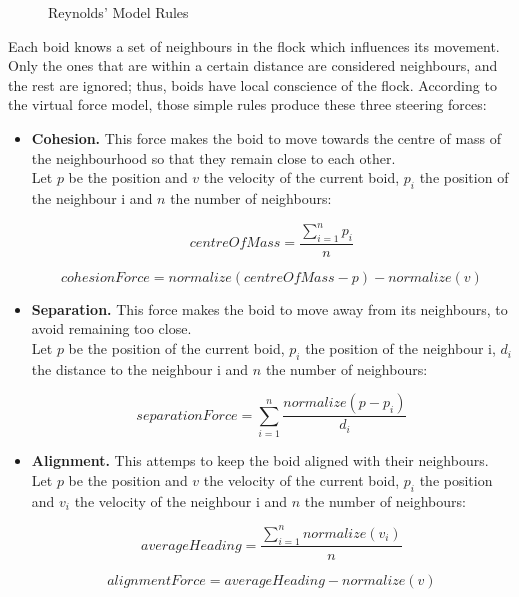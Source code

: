 \begin{figure}[!h]
\begin{tabular}{c c c}
 \end{tabular}
  \caption{Reynolds' Model Rules}
  \label{fig:crowds}
\end{figure}

Each boid knows a set of neighbours in the flock which influences its movement. Only the ones that are within a certain distance are considered neighbours, and the rest are ignored; thus, boids have local conscience of the flock. According to the virtual force model, those simple rules produce these three steering forces:

\begin{itemize}

\item{{\bf Cohesion.} This force makes the boid to move towards the centre of mass of the neighbourhood so that they remain close to each other.\\

Let $p$ be the position and $v$ the velocity of the current boid, $p_i$ the position of the neighbour i and $n$ the number of neighbours:

\begin{equation}
  centreOfMass=\frac{\sum_{i=1}^np_i}{n}
\end{equation}

\begin{equation}
  cohesionForce=normalize(centreOfMass-p)-normalize(v)
\end{equation}
}

\item{{\bf Separation.} This force makes the boid to move away from its neighbours, to avoid remaining too close.\\

Let $p$ be the position of the current boid, $p_i$ the position of the neighbour i, $d_i$ the distance to the neighbour i and $n$ the number of neighbours:

\begin{equation}
  separationForce=\sum_{i=1}^n\frac{normalize(p-p_i)}{d_i}
\end{equation}
}

\item{{\bf Alignment.} This attemps to keep the boid aligned with their neighbours.\\

Let $p$ be the position and $v$ the velocity of the current boid, $p_i$ the position and $v_i$ the velocity of the neighbour i and $n$ the number of neighbours:

\begin{equation}
  averageHeading=\frac{\sum_{i=1}^nnormalize(v_i)}{n}
\end{equation}

\begin{equation}
  alignmentForce=averageHeading-normalize(v)
\end{equation}
}

\end{itemize}

